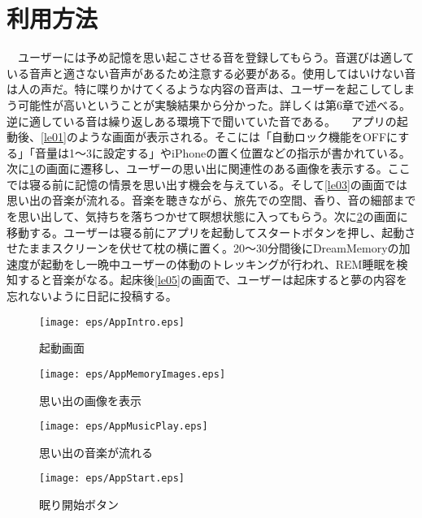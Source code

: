 \section{利用方法}
　ユーザーには予め記憶を思い起こさせる音を登録してもらう。音選びは適している音声と適さない音声があるため注意する必要がある。使用してはいけない音は人の声だ。特に喋りかけてくるような内容の音声は、ユーザーを起こしてしまう可能性が高いということが実験結果から分かった。詳しくは第6章で述べる。逆に適している音は繰り返しある環境下で聞いていた音である。
　アプリの起動後、\ref{le01}のような画面が表示される。そこには「自動ロック機能をOFFにする」「音量は1〜3に設定する」やiPhoneの置く位置などの指示が書かれている。次に\ref{le02}の画面に遷移し、ユーザーの思い出に関連性のある画像を表示する。ここでは寝る前に記憶の情景を思い出す機会を与えている。そして\ref{le03}の画面では思い出の音楽が流れる。音楽を聴きながら、旅先での空間、香り、音の細部までを思い出して、気持ちを落ちつかせて瞑想状態に入ってもらう。次に\ref{le04}の画面に移動する。ユーザーは寝る前にアプリを起動してスタートボタンを押し、起動させたままスクリーンを伏せて枕の横に置く。20〜30分間後にDreamMemoryの加速度が起動をし一晩中ユーザーの体動のトレッキングが行われ、REM睡眠を検知すると音楽がなる。起床後\ref{le05}の画面で、ユーザーは起床すると夢の内容を忘れないように日記に投稿する。

\begin{figure}[htbp]
 \begin{minipage}{0.45\hsize}
  \begin{center}
   \texttt{[image: eps/AppIntro.eps]}
  \end{center}
  \caption{起動画面}
  \label{le01}
 \end{minipage}
 \begin{minipage}{0.45\hsize}
  \begin{center}
   \texttt{[image: eps/AppMemoryImages.eps]}
  \end{center}
  \caption{思い出の画像を表示}
  \label{le02}
 \end{minipage}
\end{figure}

\begin{figure}[htbp]
 \begin{minipage}{0.45\hsize}
  \begin{center}
   \texttt{[image: eps/AppMusicPlay.eps]}
  \end{center}
  \caption{思い出の音楽が流れる}
  \label{le03}
 \end{minipage}
 \begin{minipage}{0.45\hsize}
  \begin{center}
   \texttt{[image: eps/AppStart.eps]}
  \end{center}
  \caption{眠り開始ボタン}
  \label{le04}
 \end{minipage}
\end{figure}

